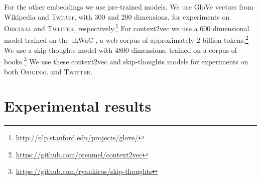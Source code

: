 \documentclass[11pt]{article}
\newcommand\original{\textsc{Original}\xspace}
\newcommand\twitter{\textsc{Twitter}\xspace}
\newcommand\glove{GloVe\xspace}
\begin{document}
For the other embeddings we use pre-trained models. We use \glove
vectors from Wikipedia and Twitter, with 300 and 200 dimensions, for
experiments on \original and \twitter,
respectively.\footnote{\url{http://nlp.stanford.edu/projects/glove/}}
For context2vec we use a 600 dimensional model trained on the ukWaC
\cite{Ferraresi2008}, a web corpus of approximately 2 billion
tokens.\footnote{\url{https://github.com/orenmel/context2vec}} We use
a skip-thoughts model with 4800 dimensions, trained on a corpus of
books.\footnote{\url{https://github.com/ryankiros/skip-thoughts}} We
use these context2vec and skip-thoughts models for experiments on both
\original and \twitter.





\section{Experimental results\label{sec:results}}




\end{document}
